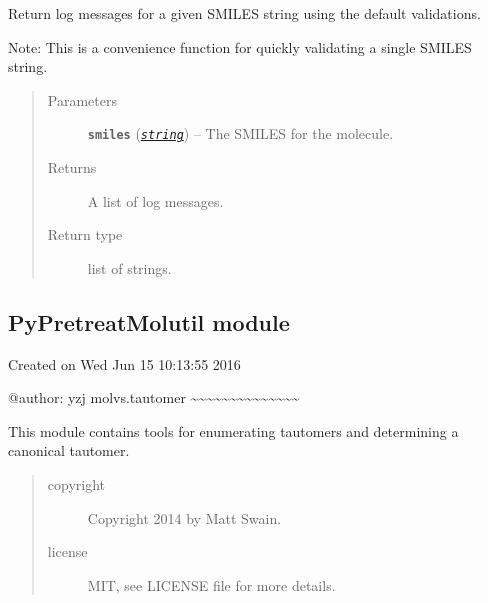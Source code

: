 \documentclass[letterpaper,10pt,english]{sphinxmanual}
\begin{document}

\begin{fulllineitems}
\label{reference/PyPretreatMol:PyPretreatMol.ValidatorSmi}
Return log messages for a given SMILES string using the default validations.

Note: This is a convenience function for quickly validating a single SMILES string.
\begin{quote}\begin{description}
\item[{Parameters}] \leavevmode
\textbf{\texttt{smiles}} (\href{https://docs.python.org/2/library/string.html\#module-string}{\emph{\texttt{string}}}) -- The SMILES for the molecule.

\item[{Returns}] \leavevmode
A list of log messages.

\item[{Return type}] \leavevmode
list of strings.

\end{description}\end{quote}

\end{fulllineitems}



\subsection{PyPretreatMolutil module}
\label{reference/PyPretreatMolutil::doc}\label{reference/PyPretreatMolutil:pypretreatmolutil-module}\label{reference/PyPretreatMolutil:module-PyPretreatMolutil}
Created on Wed Jun 15 10:13:55 2016

@author: yzj
molvs.tautomer
\textasciitilde{}\textasciitilde{}\textasciitilde{}\textasciitilde{}\textasciitilde{}\textasciitilde{}\textasciitilde{}\textasciitilde{}\textasciitilde{}\textasciitilde{}\textasciitilde{}\textasciitilde{}\textasciitilde{}\textasciitilde{}

This module contains tools for enumerating tautomers and determining a canonical tautomer.
\begin{quote}\begin{description}
\item[{copyright}] \leavevmode
Copyright 2014 by Matt Swain.

\item[{license}] \leavevmode
MIT, see LICENSE file for more details.

\end{description}\end{quote}
\end{document}
